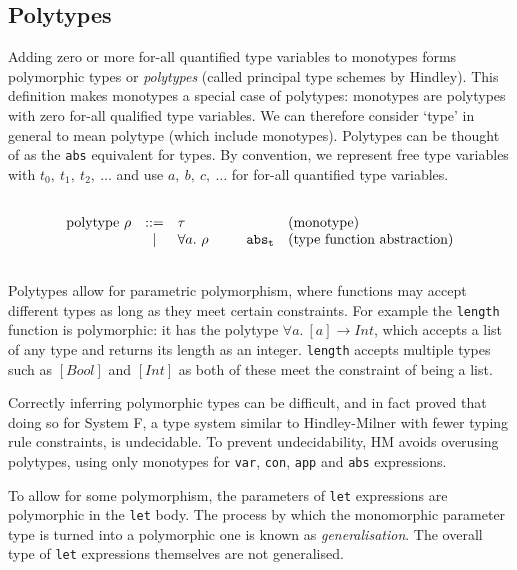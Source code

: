 \documentclass[a4paper,fleqn,oneside,12pt]{report}
\begin{document}
\subsection{Polytypes}

Adding zero or more for-all quantified type variables to monotypes forms polymorphic types or \textit{polytypes} (called principal type schemes by Hindley). This definition makes monotypes a special case of polytypes: monotypes are polytypes with zero for-all qualified type variables. We can therefore consider `type' in general to mean polytype (which include monotypes). Polytypes can be thought of as the \texttt{abs} equivalent for types. By convention, we represent free type variables with $t_0,\ t_1,\ t_2,\ \dots$ and use $a,\ b,\ c,\ \dots$ for for-all quantified type variables.

$$\begin{array}{lcllll}
  \\
    \textrm{polytype}\ \rho & ::= & \tau            & \hspace{0.25cm} & & \textrm{(monotype)}\\
                          & \vert & \forall a.\ \rho &                 & \mathtt{abs_t} & \textrm{(type function abstraction)}\\
  \\
\end{array}
$$

Polytypes allow for parametric polymorphism, where functions may accept different types as long as they meet certain constraints. For example the \texttt{length} function is polymorphic: it has the polytype $\forall a.\ [a] \rightarrow Int$, which accepts a list of any type and returns its length as an integer. \texttt{length} accepts multiple types such as $[Bool]$ and $[Int]$ as both of these meet the constraint of being a list.

Correctly inferring polymorphic types can be difficult, and in fact \cite{ref14} proved that doing so for System F, a type system similar to Hindley-Milner with fewer typing rule constraints, is undecidable. To prevent undecidability, HM avoids overusing polytypes, using only monotypes for \texttt{var}, \texttt{con}, \texttt{app} and \texttt{abs} expressions.

To allow for some polymorphism, the parameters of \texttt{let} expressions are polymorphic in the \texttt{let} body. The process by which the monomorphic parameter type is turned into a polymorphic one is known as \textit{generalisation}. The overall type of \texttt{let} expressions themselves are not generalised.
\end{document}
